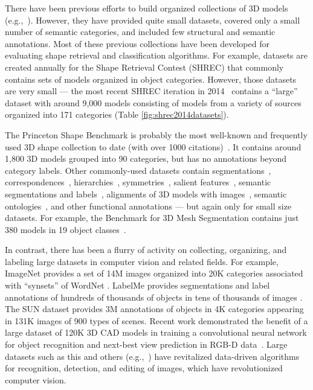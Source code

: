 There have been previous efforts to build organized collections of 3D models (e.g.,~\cite{AIM@SHAPE,GAMMA}). However, they have provided quite small datasets, covered only a small number of semantic categories, and included few structural and semantic annotations. Most of these previous collections have been developed for evaluating shape retrieval and classification algorithms. For example, datasets are created annually for the Shape Retrieval Contest (SHREC) that commonly contains sets of models organized in object categories. However, those datasets are very small --- the most recent SHREC iteration in 2014~\cite{li:2014:shrec} contains a ``large'' dataset with around 9,000 models consisting of models from a variety of sources organized into 171 categories (Table \ref{fig:shrec2014datasets}).

The Princeton Shape Benchmark is probably the most well-known and frequently used 3D shape collection to date (with over 1000 citations)~\cite{shilane:2004:princeton}.  It contains around 1,800 3D models grouped into 90 categories, but has no annotations beyond category labels.  Other commonly-used datasets contain segmentations~\cite{Chen:2009:segmentationbenchmark}, correspondences~\cite{Kim:2012:fuzzycorres, Kim:2013:partbasedtemplates}, hierarchies~\cite{Liu:2014:creating}, symmetries~\cite{Kim:2010:mobius}, salient features~\cite{Chen:2012:schelling}, semantic segmentations and labels~\cite{Xiao:2013:sun3d}, alignments of 3D models with images~\cite{xiang:2014:pascal3d}, semantic ontologies~\cite{AIM@SHAPE}, and other functional annotations --- but again only for small size datasets.  For example, the Benchmark for 3D Mesh Segmentation contains just 380 models in 19 object classes~\cite{Chen:2009:segmentationbenchmark}.

In contrast, there has been a flurry of activity on collecting, organizing, and labeling large datasets in computer vision and related fields.  For example, ImageNet \cite{deng:2009:imagenet} provides a set of 14M images organized into 20K categories associated with ``synsets'' of WordNet \cite{miller:1995:wordnet}.  LabelMe provides segmentations and label annotations of hundreds of thousands of objects in tens of thousands of images \cite{russell:2009:labelme}.  The SUN dataset provides 3M annotations of objects in 4K categories appearing in 131K images of 900 types of scenes. Recent work demonstrated the benefit of a large dataset of 120K 3D CAD models in training a convolutional neural network for object recognition and next-best view prediction in RGB-D data~\cite{wu:2014:3d}. Large datasets such as this and others (e.g.,~\cite{krause:2013:finegrain, liebelt:2010:multi}) have revitalized data-driven algorithms for recognition, detection, and editing of images, which have revolutionized computer vision.

